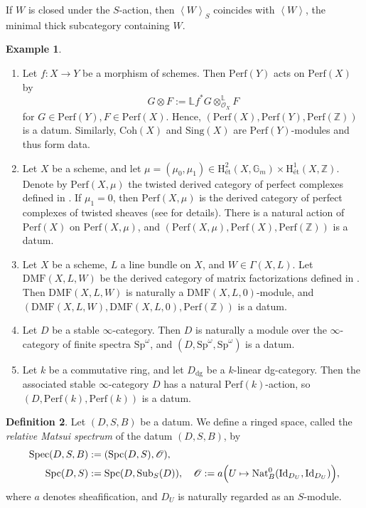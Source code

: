 \documentclass[11pt]{amsart}
\theoremstyle{definition}
\newtheorem{defn}{Definition}[section]
\newtheorem{example}[defn]{Example}
\theoremstyle{plain}
\theoremstyle{remark}
\newcommand{\perf}{\mathrm{Perf}}
\newcommand{\coh}{{\mathrm{Coh}}}
\newcommand{\Spec}{\mathrm{Spec}}
\newcommand{\Sub}{\mathrm{Sub}}
\newcommand{\mo}{\mathrm}
\newcommand{\Nat}{\mathrm{Nat}}
\newcommand{\sO}{\mathscr{O}}
\newcommand{\ld}{\mathbb{L}}
\newcommand{\dotimes}{\otimes^{\mathbb{L}}}
\newcommand{\Id}{\mathrm{Id}}
\newcommand{\Sing}{\mathrm{Sing}}
\newcommand{\ang}[1]{{\left\langle{#1}\right\rangle}}
\newcommand{\etch}{\mathrm{H}_{\text{\'{e}t}}}
\newcommand{\Spc}{\mathrm{Spc}}
\numberwithin{equation}{section}
\begin{document}
If \(W\) is closed under the \(S\)-action, then \(\ang{W}_S\) coincides with \(\ang{W}\), the minimal thick subcategory containing \(W\).


\begin{example}
  \begin{enumerate}
    \item Let \(f:X\to Y\) be a morphism of schemes.
    Then \(\perf(Y)\) acts on \(\perf(X)\) by
    \[
      G\otimes F := \ld f^* G \dotimes_{\sO_X} F
    \]
    for \(G\in \perf(Y), F\in \perf(X)\).
    Hence, \((\perf(X), \perf(Y), \perf(\mathbb{Z}))\) is a datum.
    Similarly, \(\coh(X)\) and \(\Sing(X)\) are \(\perf(Y)\)-modules and thus form data.

    \item Let \(X\) be a scheme, and let \(\mu=(\mu_0,\mu_1)\in \etch^2(X,\mathbb{G}_m)\times \etch^1(X,\mathbb{Z})\).
    Denote by \(\perf(X,\mu)\) the twisted derived category of perfect complexes defined in \cite{To2}.
    If \(\mu_1=0\), then \(\perf(X,\mu)\) is the derived category of perfect complexes of twisted sheaves (see \cite{Ca} for details).
    There is a natural action of \(\perf(X)\) on \(\perf(X,\mu)\), and \((\perf(X,\mu),\perf(X),\perf(\mathbb{Z}))\) is a datum.

    \item Let \(X\) be a scheme, \(L\) a line bundle on \(X\), and \(W\in \Gamma(X,L)\).
    Let \(\mo{DMF}(X,L,W)\) be the derived category of matrix factorizations defined in \cite{Pos, EP}.
    Then \(\mo{DMF}(X,L,W)\) is naturally a \(\mo{DMF}(X,L,0)\)-module, and \((\mo{DMF}(X,L,W),\mo{DMF}(X,L,0),\perf(\mathbb{Z}))\) is a datum.

    \item Let \(D\) be a stable \(\infty\)-category.
    Then \(D\) is naturally a module over the \(\infty\)-category of finite spectra \(\mo{Sp}^{\omega}\), and \((D,\mo{Sp}^{\omega},\mo{Sp}^{\omega})\) is a datum.

    \item Let \(k\) be a commutative ring, and let \(D_{\mo{dg}}\) be a \(k\)-linear dg-category.
    Then the associated stable \(\infty\)-category \(D\) has a natural \(\perf(k)\)-action, so \((D, \perf(k), \perf(k))\) is a datum.
  \end{enumerate}
\end{example}

\begin{defn}
Let \((D,S,B)\) be a datum.
We define a ringed space, called the \emph{relative Matsui spectrum} of the datum \((D,S,B)\), by
\begin{align*}
  \Spec(D,S,B)&:=(\Spc(D,S),\sO),\\
  \Spc(D,S)&:=\Spc(D,\Sub_S(D)), \quad
  \sO:=a\Bigl(U \mapsto \Nat_B^0(\Id_{D_U},\Id_{D_U}) \Bigr),
\end{align*}
where \(a\) denotes sheafification, and \(D_U\) is naturally regarded as an \(S\)-module.
\end{defn}
\end{document}
